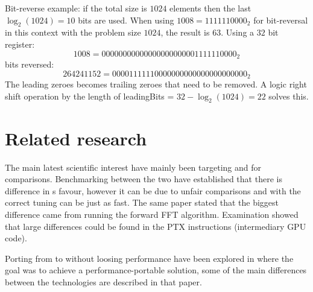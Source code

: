 Bit-reverse example: if the total size is $1024$ elements then the last $\log_{2}(1024) = 10$ bits are used. When using $1008 = 1111110000_{2}$ for bit-reversal in this context with the problem size $1024$, the result is $63$. Using a $32$ bit register:
\begin{equation}
	1008 = 00000000000000000000001111110000_{2}
\end{equation}
bits reversed:
\begin{equation}
	264241152 = 00001111110000000000000000000000_{2} 
\end{equation}
The leading zeroes becomes trailing zeroes that need to be removed. A logic right shift operation by the length of leadingBits = $32 - \log_{2}(1024) = 22$ solves this.

\section{Related research}

The main latest scientific interest have mainly been targeting {\CU} and {\OCL} for comparisons. Benchmarking between the two have established that there is difference in {\CU}s favour, however it can be due to unfair comparisons\cite{fang2011comprehensive} and with the correct tuning {\OCL} can be just as fast. The same paper stated that the biggest difference came from running the forward \gls{FFT} algorithm. Examination showed that large differences could be found in the \gls{PTX} instructions (intermediary \gls{GPU} code).

Porting from {\CU} to {\OCL} without loosing performance have been explored in \cite{du2012cuda} where the goal was to achieve a performance-portable solution, some of the main differences between the technologies are described in that paper.
